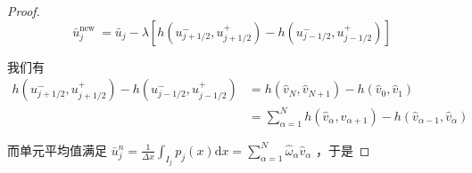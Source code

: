 \documentclass{article}
\numberwithin{equation}{subsection}    %
\begin{document}
\begin{proof}
    \begin{equation}
        \bar{u}_{j}^{\text {new }}=\bar{u}_{j}-\lambda\left[h\left(u_{j+1 / 2}^{-}, u_{j+1 / 2}^{+}\right)-h\left(u_{j-1 / 2}^{-}, u_{j-1 / 2}^{+}\right)\right]
    \end{equation}

    我们有
    \begin{equation}
        \begin{aligned}
            h\left(u_{j+1 / 2}^{-}, u_{j+1 / 2}^{+}\right)-h\left(u_{j-1 / 2}^{-}, u_{j-1 / 2}^{+}\right) & =h\left(\hat{v}_{N}, \hat{v}_{N+1}\right)-h\left(\hat{v}_{0}, \hat{v}_{1}\right)                                           \\
                                                                                                          & =\sum_{\alpha=1}^{N} h\left(\hat{v}_{\alpha}, \hat{v}_{\alpha+1}\right)-h\left(\hat{v}_{\alpha-1}, \hat{v}_{\alpha}\right)
        \end{aligned}
    \end{equation}



    而单元平均值满足  $\bar{u}_{j}^{n}=\frac{1}{\Delta x} \int_{I_{j}} p_{j}(x) \mathrm{d} x=\sum_{\alpha=1}^{N} \hat{\omega}_{\alpha} \hat{v}_{\alpha}$  ，于是


\end{proof}
\end{document}
